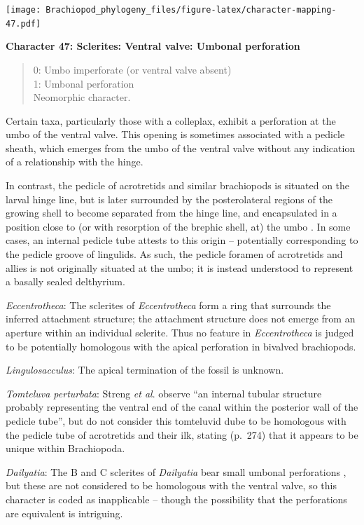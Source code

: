 \documentclass[]{book}
\theoremstyle{definition}
\theoremstyle{definition}
\theoremstyle{definition}
\theoremstyle{remark}
\begin{document}
\texttt{[image: Brachiopod\_phylogeny\_files/figure-latex/character-mapping-47.pdf]}

\textbf{Character 47: Sclerites: Ventral valve: Umbonal perforation}

\begin{quote}
0: Umbo imperforate (or ventral valve absent)\\
1: Umbonal perforation\\
Neomorphic character.
\end{quote}

Certain taxa, particularly those with a colleplax, exhibit a perforation
at the umbo of the ventral valve. This opening is sometimes associated
with a pedicle sheath, which emerges from the umbo of the ventral valve
without any indication of a relationship with the hinge.

In contrast, the pedicle of acrotretids and similar brachiopods is
situated on the larval hinge line, but is later surrounded by the
posterolateral regions of the growing shell to become separated from the
hinge line, and encapsulated in a position close to (or with resorption
of the brephic shell, at) the umbo \citep[see][pp.~407--411 and fig. 3
for discussion]{Popov1992TheCambrian}. In some cases, an internal
pedicle tube attests to this origin -- potentially corresponding to the
pedicle groove of lingulids. As such, the pedicle foramen of acrotretids
and allies is not originally situated at the umbo; it is instead
understood to represent a basally sealed delthyrium.

\emph{Eccentrotheca}: The sclerites of \emph{Eccentrotheca} form a ring
that surrounds the inferred attachment structure; the attachment
structure does not emerge from an aperture within an individual
sclerite. Thus no feature in \emph{Eccentrotheca} is judged to be
potentially homologous with the apical perforation in bivalved
brachiopods.

\emph{Lingulosacculus}: The apical termination of the fossil is unknown.

\emph{Tomteluva perturbata}: Streng \emph{et al}.
\citeyearpar{Streng2016Anew} observe ``an internal tubular structure
probably representing the ventral end of the canal within the posterior
wall of the pedicle tube'', but do not consider this tomteluvid dube to
be homologous with the pedicle tube of acrotretids and their ilk,
stating (p.~274) that it appears to be unique within Brachiopoda.

\emph{Dailyatia}: The B and C sclerites of \emph{Dailyatia} bear small
umbonal perforations \citep{Skovsted2015Theearly}, but these are not
considered to be homologous with the ventral valve, so this character is
coded as inapplicable -- though the possibility that the perforations
are equivalent is intriguing.
\end{document}
